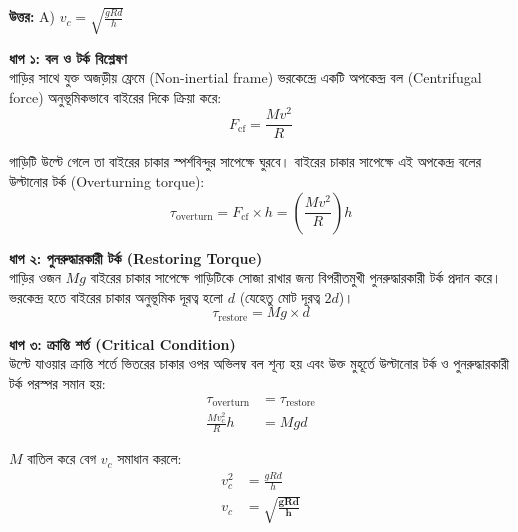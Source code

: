 \documentclass[12pt, a4paper]{article}
\begin{document}
\vspace{0.5em}
\begin{tcolorbox}[answerbox]
    \textbf{\color{success} উত্তর:} A) $v_c = \sqrt{\frac{g R d}{h}}$
\end{tcolorbox}
\vspace{1em}

\begin{tcolorbox}[solutionbox={সমাধান (Solution)}]
    \noindent
    \textbf{ধাপ ১: বল ও টর্ক বিশ্লেষণ} \\
    গাড়ির সাথে যুক্ত অজড়ীয় ফ্রেমে (Non-inertial frame) ভরকেন্দ্রে একটি অপকেন্দ্র বল (Centrifugal force) অনুভূমিকভাবে বাইরের দিকে ক্রিয়া করে:
    \[ F_{\text{cf}} = \frac{M v^2}{R} \]
    
    গাড়িটি উল্টে গেলে তা বাইরের চাকার স্পর্শবিন্দুর সাপেক্ষে ঘুরবে। বাইরের চাকার সাপেক্ষে এই অপকেন্দ্র বলের উল্টানোর টর্ক (Overturning torque):
    \[ \tau_{\text{overturn}} = F_{\text{cf}} \times h = \left(\frac{M v^2}{R}\right) h \]
    
    \vspace{0.5em}
    \noindent\textbf{ধাপ ২: পুনরুদ্ধারকারী টর্ক (Restoring Torque)} \\
    গাড়ির ওজন $Mg$ বাইরের চাকার সাপেক্ষে গাড়িটিকে সোজা রাখার জন্য বিপরীতমুখী পুনরুদ্ধারকারী টর্ক প্রদান করে। ভরকেন্দ্র হতে বাইরের চাকার অনুভূমিক দূরত্ব হলো $d$ (যেহেতু মোট দূরত্ব $2d$)।
    \[ \tau_{\text{restore}} = M g \times d \]
    
    \vspace{0.5em}
    \noindent\textbf{ধাপ ৩: ক্রান্তি শর্ত (Critical Condition)} \\
    উল্টে যাওয়ার ক্রান্তি শর্তে ভিতরের চাকার ওপর অভিলম্ব বল শূন্য হয় এবং উক্ত মুহূর্তে উল্টানোর টর্ক ও পুনরুদ্ধারকারী টর্ক পরস্পর সমান হয়:
    \begin{align*}
        \tau_{\text{overturn}} &= \tau_{\text{restore}} \\
        \frac{M v_c^2}{R} h &= M g d
    \end{align*}
    
    $M$ বাতিল করে বেগ $v_c$ সমাধান করলে:
    \begin{align*}
        v_c^2 &= \frac{g R d}{h} \\
        v_c &= \mathbf{\sqrt{\frac{g R d}{h}}}
    \end{align*}
\end{tcolorbox}

\newpage
\end{document}

